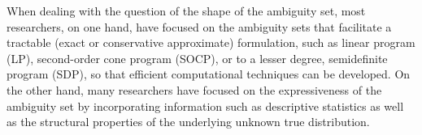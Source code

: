 \documentclass[final,onefignum,onetabnum]{class}
\newcommand{\dro}{DRO}
\begin{document}
When dealing with the question of the shape of the ambiguity set,  most  researchers, on one hand, have focused on the ambiguity sets that facilitate a tractable (exact or conservative approximate) formulation, such as linear program (LP), second-order cone program (SOCP), or to a lesser degree, semidefinite program (SDP), so that efficient computational techniques can be developed. On the other hand, many researchers have focused on the expressiveness of the ambiguity set by incorporating information such as  descriptive statistics as well as the structural properties  of the underlying unknown true distribution. 
\end{document}
